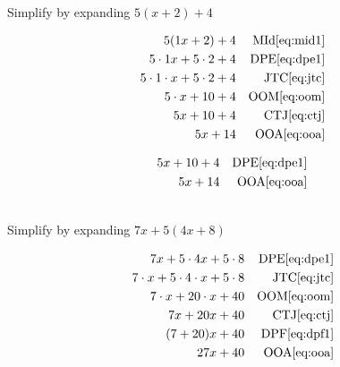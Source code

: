 \begin{example}[id:20141109-093220] \label{20141109-093220}  \hfill \\

Simplify by expanding $5(x+2)+4$

\soln

\solnsteps
\begin{align*}
5(1x+2)+4 && \text{MId} \eqref{eq:mid1} \\
5 \cdot 1x + 5 \cdot 2 + 4 && \text{DPE} \eqref{eq:dpe1} \\ 
5 \cdot 1 \cdot x + 5 \cdot 2 + 4 && \text{JTC} \eqref{eq:jtc} \\
5 \cdot x +10+4 && \text{OOM} \eqref{eq:oom} \\
5x+10+4 && \text{CTJ} \eqref{eq:ctj} \\
5x+14 && \text{OOA} \eqref{eq:ooa} \\
\end{align*}

\soln

\lesssteps
\begin{align*}
5x + 10 + 4 && \text{DPE} \eqref{eq:dpe1} \\
5x + 14 && \text{OOA} \eqref{eq:ooa} 
\end{align*}
\end{example}

\begin{example}[id:20141109-093419] \label{20141109-093419}  \hfill \\

Simplify by expanding $7x +5(4x+8)$ 

\soln

\solnsteps
\begin{align*}
7x + 5 \cdot 4x + 5 \cdot 8 && \text{DPE} \eqref{eq:dpe1} \\ 
7 \cdot x + 5 \cdot 4 \cdot x + 5 \cdot 8 && \text{JTC} \eqref{eq:jtc} \\
7 \cdot x + 20 \cdot x + 40 && \text{OOM} \eqref{eq:oom} \\
7x + 20x + 40 && \text{CTJ} \eqref{eq:ctj} \\
(7+20)x + 40 && \text{DPF} \eqref{eq:dpf1} \\ 
27x+40 && \text{OOA} \eqref{eq:ooa} 
\end{align*}
\end{example}

